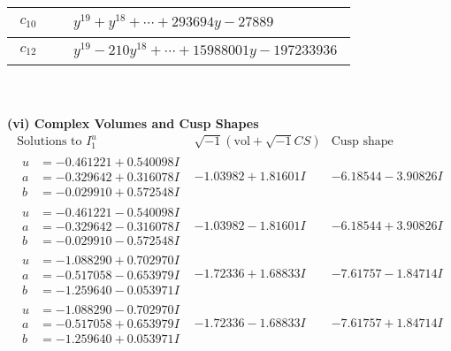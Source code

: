 \documentclass[1p]{elsarticle_modified}
\theoremstyle{definition}
\newcommand{\I}{\sqrt{-1}}
\begin{document}
\begin{tabular}{m{50pt}|m{274pt}}
\hline $$\begin{aligned}c_{10}\end{aligned}$$&$\begin{aligned}
&y^{19}+y^{18}+\cdots+293694 y-27889
\end{aligned}$\\
\hline $$\begin{aligned}c_{12}\end{aligned}$$&$\begin{aligned}
&y^{19}-210 y^{18}+\cdots+15988001 y-197233936
\end{aligned}$\\
\hline
\end{tabular}\\~\\
\newpage\flushleft \textbf{(vi) Complex Volumes and Cusp Shapes}
$$\begin{array}{c|c|c}  
\text{Solutions to }I^u_{1}& \I (\text{vol} + \sqrt{-1}CS) & \text{Cusp shape}\\
 \hline 
\begin{aligned}
u &= -0.461221 + 0.540098 I \\
a &= -0.329642 + 0.316078 I \\
b &= -0.029910 + 0.572548 I\end{aligned}
 & -1.03982 + 1.81601 I & -6.18544 - 3.90826 I \\ \hline\begin{aligned}
u &= -0.461221 - 0.540098 I \\
a &= -0.329642 - 0.316078 I \\
b &= -0.029910 - 0.572548 I\end{aligned}
 & -1.03982 - 1.81601 I & -6.18544 + 3.90826 I \\ \hline\begin{aligned}
u &= -1.088290 + 0.702970 I \\
a &= -0.517058 - 0.653979 I \\
b &= -1.259640 - 0.053971 I\end{aligned}
 & -1.72336 + 1.68833 I & -7.61757 - 1.84714 I \\ \hline\begin{aligned}
u &= -1.088290 - 0.702970 I \\
a &= -0.517058 + 0.653979 I \\
b &= -1.259640 + 0.053971 I\end{aligned}
 & -1.72336 - 1.68833 I & -7.61757 + 1.84714 I \\ \hline\begin{aligned}

\end{aligned}
\end{array}$$
\end{document}
